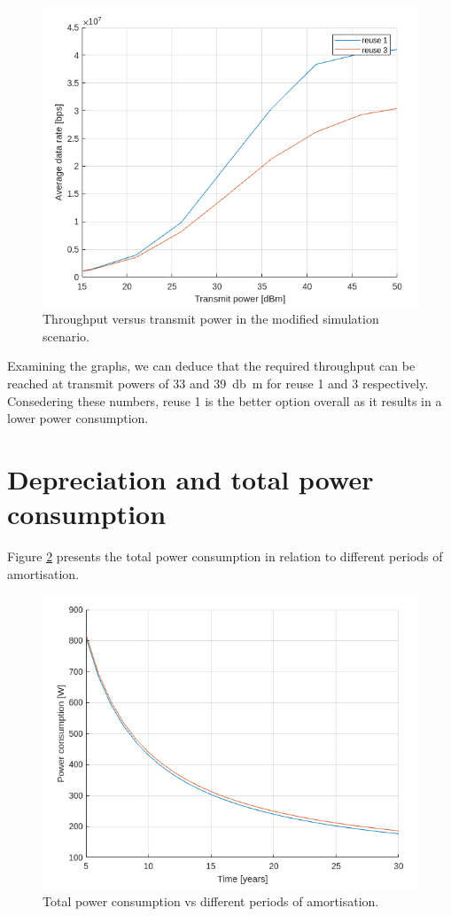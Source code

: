 \documentclass{article}
\begin{document}
\begin{figure}[p]
    \centering
    \includegraphics[width=12cm]{images/q7_Ptx_vs_throughput.png}
    \caption{Throughput versus transmit power in the modified simulation scenario.}
    \label{fig:q7_Ptx_vs_throughput}
\end{figure}

Examining the graphs, we can deduce that the required throughput can be reached at transmit powers of 33 and \SI{39}{\decibel m} for reuse 1 and 3 respectively. Consedering these numbers, reuse 1 is the better option overall as it results in a lower power consumption.

\section{Depreciation and total power consumption}
Figure \ref{fig:q8_time_vs_Ptoty} presents the total power consumption in relation to different periods of amortisation.

\begin{figure}[p]
    \centering
    \includegraphics[width=12cm]{images/q8_time_vs_Ptoty.png}
    \caption{Total power consumption vs different periods of amortisation.}
    \label{fig:q8_time_vs_Ptoty}
\end{figure}
\end{document}
